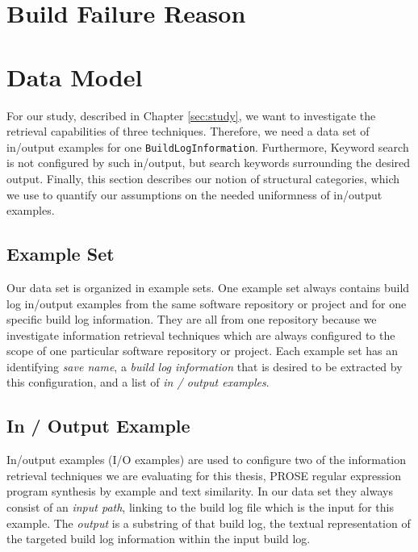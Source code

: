 \documentclass[\myrootdir/main.tex]{subfiles}
\begin{document}
\section{Build Failure Reason}


\section{Data Model}
For our study, described in Chapter \ref{sec:study}, we want to investigate the retrieval capabilities of three techniques. Therefore, we need a data set of in/output examples for one \texttt{BuildLogInformation}. Furthermore, Keyword search is not configured by such in/output, but search keywords surrounding the desired output. Finally, this section describes our notion of structural categories, which we use to quantify our assumptions on the needed uniformness of in/output examples.

\subsection{Example Set}
Our data set is organized in example sets. One example set always contains build log in/output examples from the same software repository or project and for one specific build log information. They are all from one repository because we investigate information retrieval techniques which are always configured to the scope of one particular software repository or project.
Each example set has an identifying \emph{save name}, a \emph{build log information} that is desired to be extracted by this configuration, and a list of \emph{in / output examples}.

\subsection{In / Output Example}
In/output examples (I/O examples) are used to configure two of the information retrieval techniques we are evaluating for this thesis, PROSE regular expression program synthesis by example and text similarity. In our data set they always consist of an \emph{input path}, linking to the build log file which is the input for this example. The \emph{output} is a substring of that build log, the textual representation of the targeted build log information within the input build log.
\end{document}
